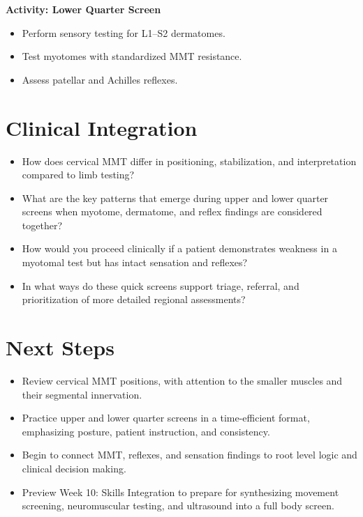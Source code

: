 \begin{labactivitybox}
\textbf{Activity: Lower Quarter Screen}

\begin{itemize}
  \item Perform sensory testing for L1–S2 dermatomes.
  \item Test myotomes with standardized MMT resistance.
  \item Assess patellar and Achilles reflexes.
\end{itemize}
\end{labactivitybox}





\section*{Clinical Integration}

\begin{itemize}
\item How does cervical MMT differ in positioning, stabilization, and interpretation compared to limb testing?
\item What are the key patterns that emerge during upper and lower quarter screens when myotome, dermatome, and reflex findings are considered together?
\item How would you proceed clinically if a patient demonstrates weakness in a myotomal test but has intact sensation and reflexes?
\item In what ways do these quick screens support triage, referral, and prioritization of more detailed regional assessments?
\end{itemize}

\section*{Next Steps}

\begin{itemize}
\item Review cervical MMT positions, with attention to the smaller muscles and their segmental innervation.
\item Practice upper and lower quarter screens in a time-efficient format, emphasizing posture, patient instruction, and consistency.
\item Begin to connect MMT, reflexes, and sensation findings to root level logic and clinical decision making.
\item Preview Week 10: Skills Integration to prepare for synthesizing movement screening, neuromuscular testing, and ultrasound into a full body screen.
\end{itemize}

